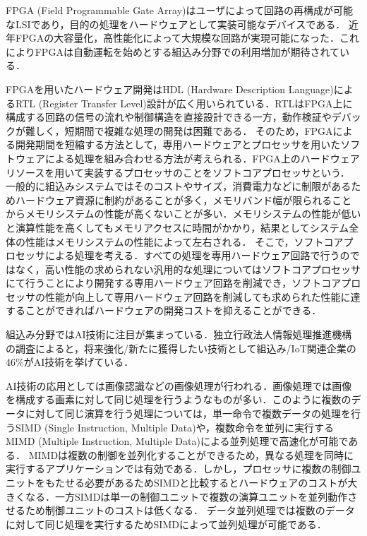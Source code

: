 FPGA (Field Programmable Gate Array)はユーザによって回路の再構成が可能なLSIであり，目的の処理をハードウェアとして実装可能なデバイスである．
近年FPGAの大容量化，高性能化によって大規模な回路が実現可能になった．これによりFPGAは自動運転を始めとする組込み分野での利用増加が期待されている．

FPGAを用いたハードウェア開発はHDL (Hardware Description Language)によるRTL (Register Transfer Level)設計が広く用いられている．RTLはFPGA上に構成する回路の信号の流れや制御構造を直接設計できる一方，動作検証やデバックが難しく，短期間で複雑な処理の開発は困難である\cite{bib:fpga}．
そのため，FPGAによる開発期間を短縮する方法として，専用ハードウェアとプロセッサを用いたソフトウェアによる処理を組み合わせる方法が考えられる．FPGA上のハードウェアリソースを用いて実装するプロセッサのことをソフトコアプロセッサという．
一般的に組込みシステムではそのコストやサイズ，消費電力などに制限があるためハードウェア資源に制約があることが多く，メモリバンド幅が限られることからメモリシステムの性能が高くないことが多い．メモリシステムの性能が低いと演算性能を高くしてもメモリアクセスに時間がかかり，結果としてシステム全体の性能はメモリシステムの性能によって左右される\cite{bib:2}．
そこで，ソフトコアプロセッサによる処理を考える．すべての処理を専用ハードウェア回路で行うのではなく，高い性能の求められない汎用的な処理についてはソフトコアプロセッサにて行うことにより開発する専用ハードウェア回路を削減でき，ソフトコアプロセッサの性能が向上して専用ハードウェア回路を削減しても求められた性能に達することができればハードウェアの開発コストを抑えることができる．

組込み分野ではAI技術に注目が集まっている．独立行政法人情報処理推進機構の調査によると，将来強化/新たに獲得したい技術として組込み/IoT関連企業の46\%がAI技術を挙げている\cite{bib:ipa}．

AI技術の応用としては画像認識などの画像処理が行われる．画像処理では画像を構成する画素に対して同じ処理を行うようなものが多い．このように複数のデータに対して同じ演算を行う処理については，単一命令で複数データの処理を行うSIMD (Single Instruction, Multiple Data)や，複数命令を並列に実行するMIMD (Multiple Instruction, Multiple Data)による並列処理で高速化が可能である\cite{bib:simd_mimd}．
MIMDは複数の制御を並列化することができるため，異なる処理を同時に実行するアプリケーションでは有効である．しかし，プロセッサに複数の制御ユニットをもたせる必要があるためSIMDと比較するとハードウェアのコストが大きくなる．一方SIMDは単一の制御ユニットで複数の演算ユニットを並列動作させるため制御ユニットのコストは低くなる．
データ並列処理では複数のデータに対して同じ処理を実行するためSIMDによって並列処理が可能である．

